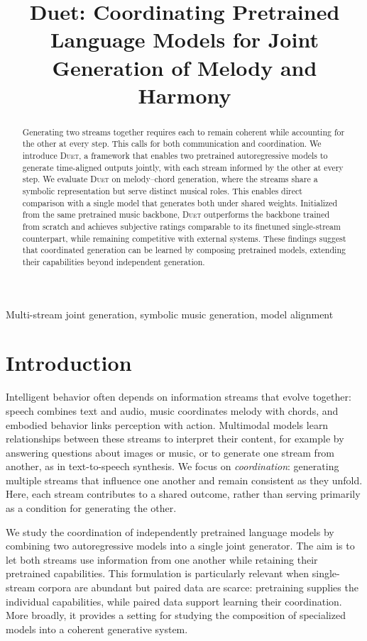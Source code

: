 \documentclass{article}
\title{Duet: Coordinating Pretrained Language Models for Joint Generation of Melody and Harmony}
\newcommand{\sys}{\textsc{Duet}\xspace}
\begin{document}
\ninept
%
\maketitle
%
\begin{abstract}
Generating two streams together requires each to remain coherent
while accounting for the other at every step. This calls for both
communication and coordination. We introduce \sys, a framework that
enables two pretrained autoregressive models to generate time-aligned
outputs jointly, with each stream informed by the other at every step.
We evaluate \sys on melody--chord generation, where the streams share
a symbolic representation but serve distinct musical roles. This
enables direct comparison with a single model that generates both
under shared weights. Initialized from the same pretrained music
backbone, \sys outperforms the backbone trained from scratch and
achieves subjective ratings comparable to its finetuned single-stream
counterpart, while remaining competitive with external systems. These
findings suggest that coordinated generation can be learned by
composing pretrained models, extending their capabilities beyond
independent generation.
\end{abstract}
%
\begin{keywords}
Multi-stream joint generation, symbolic music generation, model alignment
\end{keywords}
%

\section{Introduction}
\label{sec:intro}

Intelligent behavior often depends on information streams that evolve
together: speech combines text and audio, music coordinates melody
with chords, and embodied behavior links perception with action.
Multimodal models learn relationships between these streams to
interpret their content, for example by answering questions about
images or music, or to generate one stream from another, as in
text-to-speech synthesis. We focus on \emph{coordination}: generating
multiple streams that influence one another and remain consistent as
they unfold. Here, each stream contributes to a shared outcome, rather
than serving primarily as a condition for generating the other.

We study the coordination of independently pretrained language models
by combining two autoregressive models into a single joint generator.
The aim is to let both streams use information from one another while
retaining their pretrained capabilities. This formulation is
particularly relevant when single-stream corpora are abundant but
paired data are scarce: pretraining supplies the individual
capabilities, while paired data support learning their coordination.
More broadly, it provides a setting for studying the composition of
specialized models into a coherent generative system.
\end{document}
